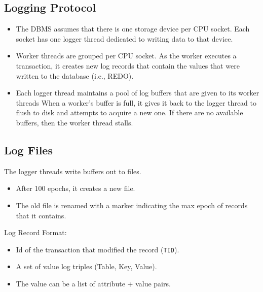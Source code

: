\documentclass[11pt]{article}
\begin{document}
\subsection{Logging Protocol}
\begin{itemize}
    \item
    The DBMS assumes that there is one storage device per CPU socket.
    Each socket has one logger thread dedicated to writing data to that device.
    
    \item
    Worker threads are grouped per CPU socket.
    As the worker executes a transaction, it creates new log records that contain the values that 
were     written to the database (i.e., REDO).
    
    \item
    Each logger thread maintains a pool of log buffers that are given to its worker threads
    When a worker's buffer is full, it gives it back to the logger thread to flush to disk and 
    attempts to acquire a new one.
    If there are no available buffers, then the worker thread stalls.
\end{itemize}

\subsection{Log Files}
The logger threads write buffers out to files.
\begin{itemize}
    \item
    After 100 epochs, it creates a new file.
    
    \item
    The old file is renamed with a marker indicating the max epoch of records that it 
    contains.
\end{itemize}

Log Record Format:
\begin{itemize}
    \item
    Id of the transaction that modified the record (\texttt{TID}).
    
    \item
    A set of value log triples (Table, Key, Value).
    
    \item
    The value can be a list of attribute + value pairs.
\end{itemize}

\end{document}
